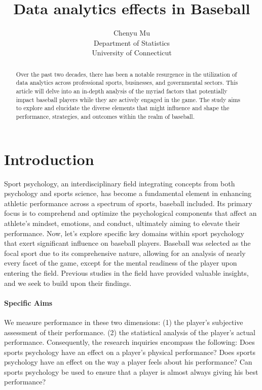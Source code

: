 \documentclass[12pt]{article}
\title{Data analytics effects in Baseball}
\author{Chenyu Mu\\
  Department of Statistics\\
  University of Connecticut
}
\begin{document}
\maketitle

\begin{abstract}
  Over the past two decades, there has been a notable resurgence in the utilization of data analytics across professional sports, businesses, and governmental sectors.
  This article will delve into an in-depth analysis of the myriad factors that potentially impact baseball players while they are actively engaged in the game. 
  The study aims to explore and elucidate the diverse elements that might influence and shape the performance, strategies, and outcomes within the realm of baseball. 
  \end{abstract}


\section{Introduction}
\label{sec:intro}
Sport psychology, an interdisciplinary field integrating concepts from both psychology and sports science, has become a fundamental element in enhancing athletic performance across a spectrum of sports, baseball included.
Its primary focus is to comprehend and optimize the psychological components that affect an athlete's mindset, emotions, and conduct, ultimately aiming to elevate their performance.
Now, let's explore specific key domains within sport psychology that exert significant influence on baseball players.
Baseball was selected as the focal sport due to its comprehensive nature, allowing for an analysis of nearly every facet of the game, except for the mental readiness of the player upon entering the field. 
Previous studies in the field \citet*{Dalmass2018baseball} have provided valuable insights, and we seek to build upon their findings. 



\paragraph{Specific Aims}
We measure performance in these two dimensions: (1) the player's subjective assessment of their performance. 
(2) the statistical analysis of the player's actual performance. Consequently, the research inquiries encompass the following:
Does sports psychology have an effect on a player's physical performance?
Does sports psychology have an effect on the way a player feels about his performance?
Can sports psychology be used to ensure that a player is almost always giving his best performance?
\end{document}
